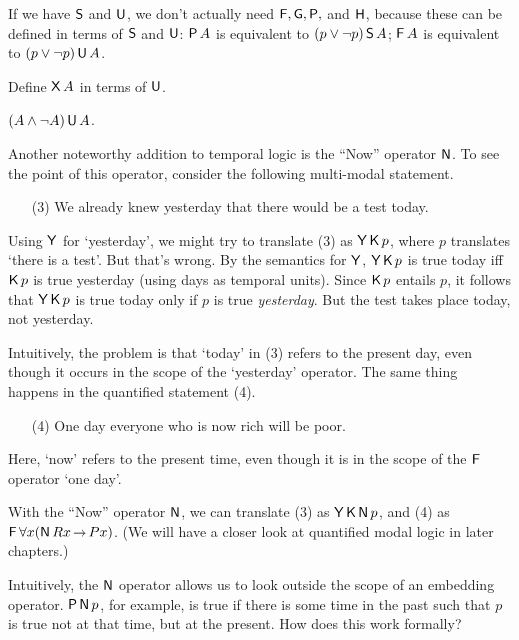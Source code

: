 If we have $\operatorname{\mathsf{S}}$ and $\operatorname{\mathsf{U}}$, we don't actually need $\operatorname{\mathsf{F}}, \operatorname{\mathsf{G}},\operatorname{\mathsf{P}},$ and $\operatorname{\mathsf{H}}$,
because these can be defined in terms of $\operatorname{\mathsf{S}}$ and $\operatorname{\mathsf{U}}$: $\operatorname{\mathsf{P}} A$ is equivalent
to $(p\lor \neg p)\operatorname{\mathsf{S}} A$; $\operatorname{\mathsf{F}} A$ is equivalent to $(p \lor \neg p)\operatorname{\mathsf{U}} A$.

\begin{exercise}
  Define $\operatorname{\mathsf{X}} A$ in terms of $\operatorname{\mathsf{U}}$.
\end{exercise}
\begin{solution}
  $(A \land \neg A) \operatorname{\mathsf{U}} A$.
\end{solution}

Another noteworthy addition to temporal logic is the ``Now'' operator $\operatorname{\mathsf{N}}$.
To see the point of this operator, consider the following multi-modal statement.

\begin{itemize}[leftmargin=10mm]
  \itemsep-1mm
\item[(3)] We already knew yesterday that there would be a test today.
\end{itemize}

Using $\operatorname{\mathsf{Y}}$ for `yesterday', we might try to translate (3) as $\operatorname{\mathsf{Y}} \operatorname{\mathsf{K}{}} p$, where
$p$ translates `there is a test'. But that's wrong. By the semantics for $\operatorname{\mathsf{Y}}$,
$\operatorname{\mathsf{Y}} \operatorname{\mathsf{K}{}} p$ is true today iff $\operatorname{\mathsf{K}{}} p$ is true yesterday (using days as temporal
units). Since $\operatorname{\mathsf{K}{}} p$ entails $p$, it follows that $\operatorname{\mathsf{Y}} \operatorname{\mathsf{K}{}} p$ is true today
only if $p$ is true \emph{yesterday}. But the test takes place today, not
yesterday.

Intuitively, the problem is that `today' in (3) refers to the present day, even
though it occurs in the scope of the `yesterday' operator. The same thing
happens in the quantified statement (4).
%
\begin{itemize}[leftmargin=10mm]
  \itemsep-1mm
\item[(4)] One day everyone who is now rich will be poor.
\end{itemize}
% 
Here, `now' refers to the present time, even though it is in the scope
of the $\operatorname{\mathsf{F}}$ operator `one day'.


With the ``Now'' operator $\operatorname{\mathsf{N}}$, we can translate (3) as $\operatorname{\mathsf{Y}} \operatorname{\mathsf{K}{}} \operatorname{\mathsf{N}} p$, and
(4) as $\tF \forall x (\tN Rx \to Px)$. (We will have a closer look at
quantified modal logic in later chapters.)

Intuitively, the $\operatorname{\mathsf{N}}$ operator allows us to look outside the scope of an
embedding operator. $\operatorname{\mathsf{P}} \operatorname{\mathsf{N}} p$, for example, is true if there is some time in
the past such that $p$ is true not at that time, but at the present. How
does this work formally?


